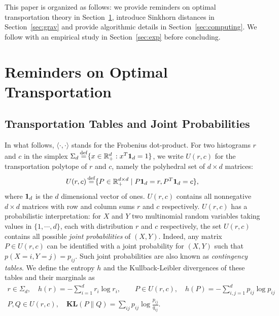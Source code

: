 \documentclass{amsart} %
\def\kl{\mathbf{KL}}
\begin{document}
This paper is organized as follows: we provide reminders on optimal transportation theory in Section~\ref{sec:rem}, introduce Sinkhorn distances in Section~\ref{sec:grav} and provide algorithmic details in Section~\ref{sec:computing}. We follow with an empirical study in Section~\ref{sec:exp} before concluding.

\section{Reminders on Optimal Transportation}\label{sec:rem}
\subsection{Transportation Tables and Joint Probabilities}  In what follows, $\langle \cdot,\cdot \rangle$ stands for the Frobenius dot-product. For two histograms $r$ and $c$ in the simplex $\Sigma_d\operatorname{\overset{\operatorname{def}}{=}} \{x\in \mathbb{R}^d_+: x^T\mathbf 1_d=1\}$,  we write $U(r,c)$ for the transportation polytope of $r$ and $c$, namely the polyhedral set of $d\times d$ matrices:
$$U(r,c)\operatorname{\overset{\operatorname{def}}{=}} \{P\in\mathbb{R}_+^{d\times d}\; |\; P\mathbf 1_d=r, P^T\mathbf 1_d=c\},$$
where $\mathbf 1_d$ is the $d$ dimensional vector of ones. $U(r,c)$ contains all nonnegative $d\times d$ matrices with row and column sums $r$ and $c$ respectively. $U(r,c)$ has a probabilistic interpretation: for $X$ and $Y$ two multinomial random variables taking values in $\{1,\cdots,d\}$, each with distribution $r$ and $c$ respectively, the set $U(r,c)$ contains all possible \emph{joint probabilities} of $(X,Y)$. Indeed, any matrix $P\in U(r,c)$ can be identified with a joint probability for $(X,Y)$ such that $p(X=i,Y=j)=p_{ij}$. Such joint probabilities are also known as \emph{contingency tables}. We define the entropy $h$ and the Kullback-Leibler divergences of these tables and their marginals as
\begin{gather*}
r\in\Sigma_d,\quad h(r)=-\sum_{i=1}^d r_i \log r_i,\quad \quad P\in U(r,c),\quad h(P)=-\sum_{i,j=1}^d p_{ij} \log p_{ij}\\ P,Q \in U(r,c),\quad \kl(P\|Q)=\sum_{ij}p_{ij}\log\frac{p_{ij}}{q_{ij}}.
\end{gather*}
\end{document}
